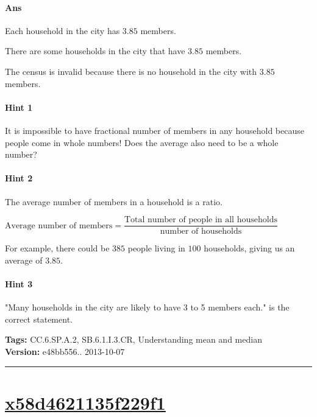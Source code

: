 \documentclass[twocolumn,10pt]{article}
\begin{document}
\paragraph{Ans} 

Each household in the city has $3.85$ members.

There are some households in the city that have $3.85$ members.

The census is invalid because there is no household in the city with $3.85$ members.


 

\paragraph{Hint 1}It is impossible to have fractional number of members in any household because people come in whole numbers! Does the average also need to be a whole number?

\paragraph{Hint 2}The average number of members in a household is a ratio.

 $\text{Average number of members}=\dfrac{\text{Total number of people in all households}}{\text{number of households}}$

For example, there could be $385$ people living in $100$ households, giving us an average of $3.85$.

\paragraph{Hint 3}"Many households in the city are likely to have 3 to 5 members each." is the correct statement.



\medskip
\noindent
\textbf{Tags:} {\footnotesize CC.6.SP.A.2, SB.6.1.I.3.CR, Understanding mean and median}\\
\textbf{Version:} e48bb556.. 2013-10-07
\smallskip\hrule





\section{\href{https://www.khanacademy.org/devadmin/content/items/x58d4621135f229f1}{x58d4621135f229f1}}
\end{document}
